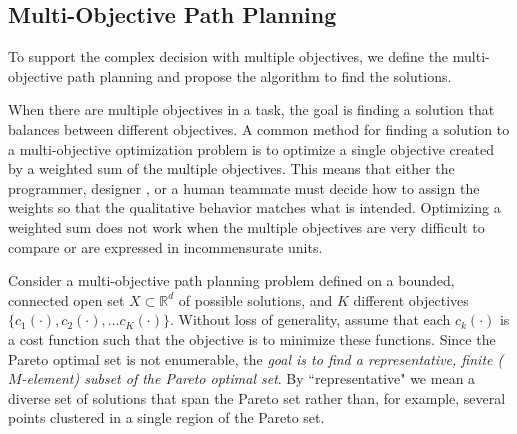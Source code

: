 \documentclass[phd]{byuprop}
\begin{document}
\subsection{Multi-Objective Path Planning}

To support the complex decision with multiple objectives, we define the multi-objective path planning and propose the algorithm to find the solutions.

When there are multiple objectives in a task, the goal is finding a solution that balances between different objectives.
A common method for finding a solution to a multi-objective optimization problem is to optimize a single objective created by a weighted sum of the multiple objectives.
This means that either the programmer, designer , or a human teammate must decide how to assign the weights so that the qualitative behavior matches what is intended. 
Optimizing a weighted sum does not work when the multiple objectives are very difficult to compare or are expressed in incommensurate units.

Consider a multi-objective path planning problem defined on a bounded, connected open set $X\subset\mathbb{R}^d$ of possible solutions, and $K$ different objectives $\{c_{1}(\cdot), c_{2}(\cdot), ... c_{K}(\cdot)\}$. 
Without loss of generality, assume that each $c_{k}(\cdot)$ is a cost function such that the objective is to minimize these functions.  
Since the Pareto optimal set is not enumerable, the {\em goal is to find a representative, finite ($M$-element) subset of the Pareto optimal set}.  
By ``representative" we mean a diverse set of solutions that span the Pareto set rather than, for example, several points clustered in a single region of the Pareto set.
\end{document}
